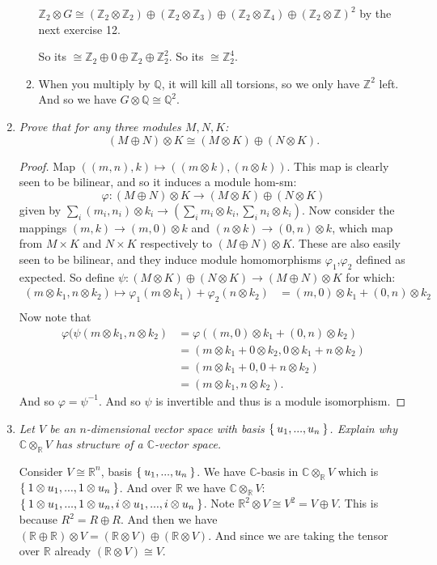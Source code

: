 \documentclass[12pt]{amsbook}
\theoremstyle{plain}
\numberwithin{section}{chapter}
\numberwithin{equation}{chapter}
\theoremstyle{definition}
\theoremstyle{remark}
\newcommand{\R}{\mathbb{R}}
\newcommand{\z}{\mathbb{Z}}
\newcommand{\Q}{\mathbb{Q}}
\renewcommand{\c}{\mathbb{C}}
\newcommand{\bee}{\begin{equation}\begin{aligned}}
\newcommand{\eee}{\end{aligned}\end{equation}}
\newcommand{\tens}{\otimes}
\renewcommand{\phi}{\varphi}
\begin{document}
\begin{enumerate}[label=\arabic*.]
\begin{enumerate}
$\z_2 \tens G \cong (\z_2 \tens \z_2) \oplus (\z_2 \tens \z_3) \oplus (\z_2 \tens \z_4) \oplus (\z_2 \tens \z)^2$ by the next exercise 12. 

So its $\cong \z_2 \oplus 0 \oplus \z_2 \oplus \z_2^2$. So its $\cong \z_2^4$. 

\item

When you multiply by $\Q$, it will kill all torsions, so we only have $\z^2$ left. And so we have $G \tens \Q \cong \Q^2$. 
\end{enumerate}

\item \textit{Prove that for any three modules $M,N,K$:
$$
(M \oplus N) \tens K \cong (M \tens K) \oplus (N \tens K).
$$ }

\begin{proof}
Map $((m,n),k) \mapsto ((m \tens k) ,(n \tens k))$. This map is clearly seen to be bilinear, and so it induces a module hom-sm:
 $$
 \phi:(M \oplus N) \tens K \to (M \tens K) \oplus (N \tens K)
 $$
 given by $\sum_i(m_i,n_i) \tens k_i \to (\sum_i m_i \tens k_i,\sum_i n_i \tens k_i)$. Now consider the mappings $(m,k) \to (m,0) \tens k$ and $(n \tens k) \to (0,n) \tens k$, which map from $M \times K$ and $N \times K$ respectively to $(M \oplus N) \tens K$. These are also easily seen to be bilinear, and they induce module homomorphisms $\phi_1$,$\phi_2$ defined as expected. So define $\psi:(M \tens K) \oplus (N \tens K) \to (M \oplus N) \tens K$ for which:
 \bee
( m \tens k_1,n \tens k_2) \mapsto \phi_1(m \tens k_1) + \phi_2(n \tens k_2)& = (m,0) \tens k_1 + (0,n) \tens k_2\\
 \eee
 Now note that 
 \bee
 \phi(\psi(m \tens k_1,n \tens k_2) &= \phi((m,0) \tens k_1 + (0,n) \tens k_2)\\
 &= (m \tens k_1 + 0 \tens k_2,0 \tens k_1 + n \tens k_2)\\
 &= (m \tens k_1 + 0,0 + n \tens k_2)\\
 &= (m \tens k_1,n \tens k_2).
 \eee
 And so $\phi = \psi^{-1}$. And so $\psi$ is invertible and thus is a module isomorphism. 
\end{proof}


\item \textit{Let $V$ be an $n$-dimensional vector space with basis $\Set{u_1,...,u_n}$. Explain why $\c \tens_\R V$ has structure of a $\c$-vector space. }

Consider $V \cong \R^n$, basis $\Set{u_1,...,u_n}$. We have $\c$-basis in $\c \tens_\R V$ which is $\Set{1 \tens u_1,...,1 \tens u_n}$. And over $\R$ we have $\c \tens_\R V$: $\Set{1 \tens u_1,...,1 \tens u_n,i \tens u_1,...,i \tens u_n}$. Note $\R^2 \tens V \cong V^2 = V \oplus V$. This is because $R^2 = R \oplus R$. And then we have $(\R \oplus \R) \tens V = (\R \tens V) \oplus (\R \tens V)$. And since we are taking the tensor over $\R$ already $(\R \tens V) \cong V$.  


\end{enumerate}
\end{document}
